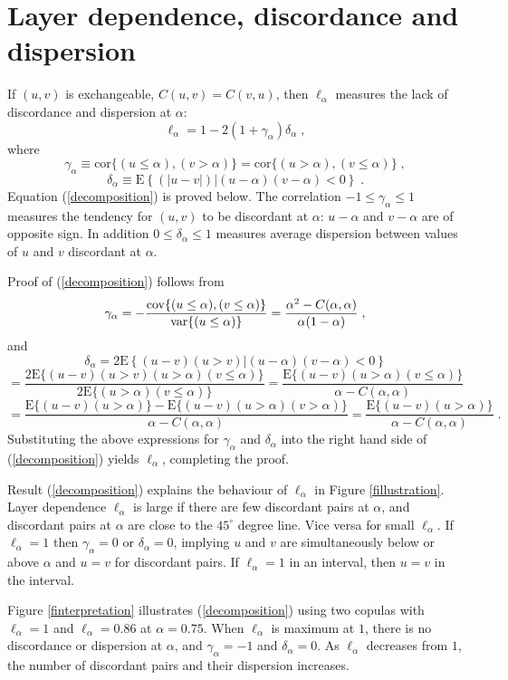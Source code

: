 \documentclass[authoryear]{elsarticle}
\newcommand{\var}{{\rm var}}
\newcommand{\cov}{{\rm cov}}
\newcommand{\E}{{\mathrm E}}
\newcommand{\cor}{\mathrm{cor}}
\newcommand{\eref}[1]{(\ref{#1})}
\newcommand{\fref}[1]{Figure \ref{#1}}
\begin{document}
\section{Layer dependence, discordance and dispersion}\label{sdecompose}

If $(u,v)$ is exchangeable,  $C(u,v)=C(v,u)$, then $\ell_\alpha$ measures the lack of discordance and dispersion at $\alpha$:
\begin{equation}\label{decomposition}
\ell_\alpha = 1-2(1+\gamma_\alpha) \delta_\alpha \;,
\end{equation}
where
$$
\gamma_\alpha \equiv \cor\{(u\leq\alpha),(v>\alpha)\} =\cor\{(u>\alpha),(v\leq\alpha)\}\;,
$$
$$
\delta_\alpha \equiv\E\left\{(|u-v|)|(u-\alpha)(v-\alpha)<0\right\}  \; .
$$
Equation \eref{decomposition} is proved below.  The correlation $-1\leq\gamma_\alpha\leq 1$ measures the tendency for $(u,v)$ to be discordant at $\alpha$: $u-\alpha$ and $v-\alpha$ are of opposite sign. In addition $0\leq \delta_\alpha\leq 1$ measures average dispersion between values of $u$ and $v$ discordant at $\alpha$.

Proof of \eref{decomposition} follows from
$$
\gamma_\alpha
=-\frac{\cov\{(u\leq\alpha),(v\leq\alpha)\}}{\var\{(u\leq\alpha)\}}
=\frac{\alpha^2-C(\alpha,\alpha)}{\alpha(1-\alpha)}   \;,
$$
and
$$
\delta_\alpha = 2 \E\left\{(u-v)(u>v)|(u-\alpha)(v-\alpha)<0\right\}
$$
$$
=  \frac{2\E\{(u-v)(u>v)(u>\alpha)(v\leq\alpha)\}}{2\E\{(u>\alpha)(v\leq\alpha)\}}
= \frac{\E\{(u-v)(u>\alpha)(v\leq\alpha)\}}{\alpha-C(\alpha,\alpha)}
$$
$$
= \frac{\E\{(u-v)(u>\alpha)\}-\E\{(u-v)(u>\alpha)(v>\alpha)\}}{\alpha-C(\alpha,\alpha)}
 = \frac{\E\{(u-v)(u>\alpha)\}}{\alpha-C(\alpha,\alpha)} \;.
$$
Substituting the above expressions for $\gamma_\alpha$ and $\delta_\alpha$ into the right hand side of \eref{decomposition} yields $\ell_\alpha$, completing the proof.

Result \eref{decomposition} explains the behaviour of $\ell_\alpha$ in \fref{fillustration}. Layer dependence $\ell_\alpha$ is large if there are few discordant pairs at $\alpha$, and  discordant pairs at $\alpha$ are close to the $45^\circ$ degree line. Vice versa for small $\ell_\alpha$. If $\ell_\alpha=1$ then $\gamma_\alpha=0$ or $\delta_\alpha=0$, implying $u$ and $v$ are simultaneously below or above $\alpha$ and $u=v$ for discordant pairs. If $\ell_\alpha=1$  in an interval, then $u=v$  in the interval.

\fref{finterpretation} illustrates \eref{decomposition} using two copulas with $\ell_\alpha=1$ and $\ell_\alpha=0.86$ at $\alpha=0.75$. When $\ell_\alpha$ is maximum at $1$, there is no discordance or dispersion at $\alpha$, and $\gamma_\alpha=-1$ and $\delta_\alpha=0$. As $\ell_\alpha$ decreases from $1$, the number of discordant pairs and their dispersion increases.
\end{document}
